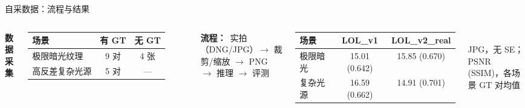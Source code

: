 \documentclass{beamer}
\begin{document}
\begin{frame}{自采数据：流程与结果}
  \vspace{-0.65em}
  \begin{columns}[T]
    \scriptsize
    \textbf{数据采集}
    \begin{tabular}{lcc}
      \toprule
      场景 & 有 GT & 无 GT \\
      \midrule
      极限暗光纹理   & 9 对 & 4 张 \\
      高反差复杂光源 & 5 对 & --- \\
      \bottomrule
    \end{tabular}

    \vspace{0.08em}
    \textbf{流程：}\ {\tiny 实拍（DNG/JPG）$\rightarrow$ 裁剪/缩放 $\rightarrow$ PNG $\rightarrow$ 推理 $\rightarrow$ 评测}

    \centering
    \scriptsize
    \renewcommand{\arraystretch}{1.12}
    \begin{tabular}{lcc}
      \toprule
      场景 & LOL\_v1 & LOL\_v2\_real \\
      \midrule
      极限暗光 &
        15.01 (0.642) & 15.85 (0.670) \\
      复杂光源 &
        16.59 (0.662) & 14.91 (0.701) \\
      \bottomrule
    \end{tabular}\\[0.2em]
    {\scriptsize JPG，无 SE；PSNR (SSIM)，各场景 GT 对均值}
  \end{columns}


\end{frame}
\end{document}
